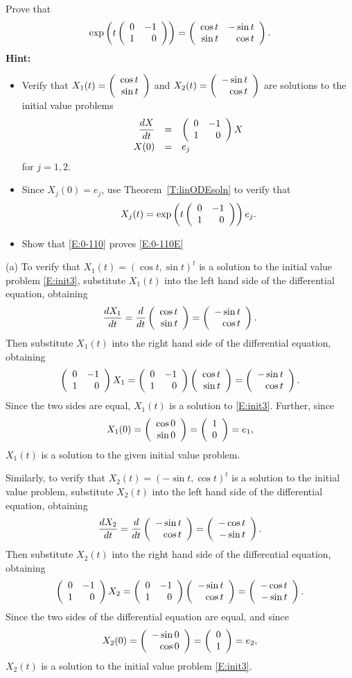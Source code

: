 \documentclass{ximera}
\begin{document}
\begin{exercise}  \label{c6.2.5C}
Prove that
\begin{equation}  \label{E:0-110E}
\exp\left(t\left(\begin{array}{rr} 0 & -1\\ 1 &0\end{array}\right)\right) =
\left(\begin{array}{rr} \cos t & -\sin t\\ \sin t &\cos t\end{array}\right).
\end{equation}
{\bf Hint:}
\begin{itemize}
\item[(a)] Verify that $X_1(t) = \left(\begin{array}{r} \cos t \\ \sin t\end{array}\right)$ and
$X_2(t) = \left(\begin{array}{r} -\sin t \\ \cos t\end{array}\right)$ are solutions to the initial value problems
\begin{equation}  \label{E:init3}
\begin{array}{rcl}
\displaystyle\frac{dX}{dt} & = & \left(\begin{array}{rr} 0 & -1\\ 1 &0\end{array}\right)X \\
X(0) & = & e_j
\end{array}
\end{equation}
for $j=1,2$.
\item[(b)] Since $X_j(0)=e_j$, use Theorem~\ref{T:linODEsoln} to verify that
\begin{equation}   \label{E:0-110}
X_j(t) = \exp\left(t\left(\begin{array}{rr} 0 & -1\\ 1 &0\end{array}\right)\right)e_j.
\end{equation}
\item[(c)]  Show that \eqref{E:0-110} proves \eqref{E:0-110E}
\end{itemize}

\begin{solution}

(a) To verify that $X_1(t) = (\cos t,\sin t)^t$ is a solution to the
initial value problem \eqref{E:init3}, substitute $X_1(t)$ into the left
hand side of the differential equation, obtaining
\[
\frac{dX_1}{dt} = \frac{d}{dt}\left(\begin{array}{r} \cos t \\ \sin t\end{array}\right) =
\left(\begin{array}{r} -\sin t \\ \cos t\end{array}\right).
\]
Then substitute $X_1(t)$ into the right hand side of the differential
equation, obtaining
\[
\left(\begin{array}{rr} 0 & -1\\ 1 &0\end{array}\right)X_1 = \left(\begin{array}{rr} 0 & -1\\ 1 &0\end{array}\right)\left(\begin{array}{r} \cos t \\ \sin t\end{array}\right)
= \left(\begin{array}{r} -\sin t \\ \cos t\end{array}\right).
\]
Since the two sides are equal, $X_1(t)$ is a solution to
\eqref{E:init3}.  Further, since
\[
X_1(0) = \left(\begin{array}{r} \cos 0 \\ \sin 0\end{array}\right) = \left(\begin{array}{r} 1 \\ 0\end{array}\right) = e_1,
\]
$X_1(t)$ is a solution to the given initial value problem.

\para Similarly, to verify that $X_2(t) = (-\sin t,\cos t)^t$ is a
solution to the initial value problem, substitute $X_2(t)$ into the
left hand side of the differential equation, obtaining
\[
\frac{dX_2}{dt} = \frac{d}{dt}\left(\begin{array}{r} -\sin t \\ \cos t\end{array}\right) =
\left(\begin{array}{r} -\cos t \\ -\sin t\end{array}\right).
\]
Then substitute $X_2(t)$ into the right hand side of the differential
equation, obtaining
\[
\left(\begin{array}{rr} 0 & -1\\ 1 &0\end{array}\right)X_2 = \left(\begin{array}{rr} 0 & -1\\ 1 &0\end{array}\right)\left(\begin{array}{r} -\sin t \\ \cos t\end{array}\right)
= \left(\begin{array}{r} -\cos t \\ -\sin t\end{array}\right).
\]
Since the two sides of the differential equation are equal, and since
\[
X_2(0) = \left(\begin{array}{r} -\sin 0 \\ \cos 0\end{array}\right) = \left(\begin{array}{r} 0 \\ 1\end{array}\right) = e_2,
\]
$X_2(t)$ is a solution to the initial value problem \eqref{E:init3}.


\end{solution}
\end{exercise}
\end{document}
